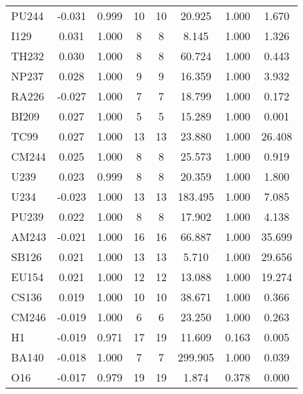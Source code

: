 \begin{tabular}{|l|ccccccc|}
PU244 & -0.031 & 0.999 & 10 & 10 & 20.925 & 1.000 & 1.670\\
I129 & 0.031 & 1.000 & 8 & 8 & 8.145 & 1.000 & 1.326\\
TH232 & 0.030 & 1.000 & 8 & 8 & 60.724 & 1.000 & 0.443\\
NP237 & 0.028 & 1.000 & 9 & 9 & 16.359 & 1.000 & 3.932\\
RA226 & -0.027 & 1.000 & 7 & 7 & 18.799 & 1.000 & 0.172\\
BI209 & 0.027 & 1.000 & 5 & 5 & 15.289 & 1.000 & 0.001\\
TC99 & 0.027 & 1.000 & 13 & 13 & 23.880 & 1.000 & 26.408\\
CM244 & 0.025 & 1.000 & 8 & 8 & 25.573 & 1.000 & 0.919\\
U239 & 0.023 & 0.999 & 8 & 8 & 20.359 & 1.000 & 1.800\\
U234 & -0.023 & 1.000 & 13 & 13 & 183.495 & 1.000 & 7.085\\
PU239 & 0.022 & 1.000 & 8 & 8 & 17.902 & 1.000 & 4.138\\
AM243 & -0.021 & 1.000 & 16 & 16 & 66.887 & 1.000 & 35.699\\
SB126 & 0.021 & 1.000 & 13 & 13 & 5.710 & 1.000 & 29.656\\
EU154 & 0.021 & 1.000 & 12 & 12 & 13.088 & 1.000 & 19.274\\
CS136 & 0.019 & 1.000 & 10 & 10 & 38.671 & 1.000 & 0.366\\
CM246 & -0.019 & 1.000 & 6 & 6 & 23.250 & 1.000 & 0.263\\
H1 & -0.019 & 0.971 & 17 & 19 & 11.609 & 0.163 & 0.005\\
BA140 & -0.018 & 1.000 & 7 & 7 & 299.905 & 1.000 & 0.039\\
O16 & -0.017 & 0.979 & 19 & 19 & 1.874 & 0.378 & 0.000\\
\hline
\end{tabular}